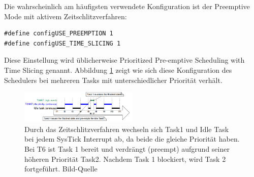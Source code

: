 Die wahrscheinlich am häufigsten verwendete Konfiguration ist der Preemptive Mode mit aktivem Zeitschlitzverfahren:
\begin{lstlisting}[numbers = none]
#define configUSE_PREEMPTION 1
#define configUSE_TIME_SLICING 1
\end{lstlisting}
Diese Einstellung wird üblicherweise Prioritized Pre-emptive Scheduling with Time Slicing genannt. Abbildung \ref{fig:timeslice} zeigt wie sich diese Konfiguration des Schedulers bei mehreren Tasks mit unterschiedlicher Priorität verhält.
\begin{figure}[htb]
	\centering
		\includegraphics[width=0.5\textwidth]{Pictures/Scheduling/timeslice2.png}
	\caption{Durch das Zeitschlitzverfahren wechseln sich Task1 und Idle Task bei jedem SysTick Interrupt ab, da beide die gleiche Priorität haben. Bei T6 ist Task 1 bereit und verdrängt (preempt) aufgrund seiner höheren Priorität Task2. Nachdem Task 1 blockiert, wird Task 2 fortgeführt. Bild-Quelle~\protect{}}
	\label{fig:timeslice}
\end{figure}
